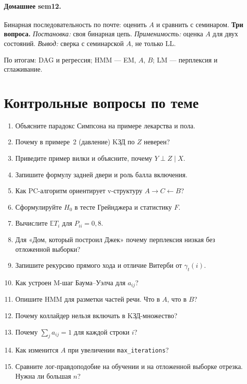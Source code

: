 \paragraph{Домашнее sem12.}
Бинарная последовательность по почте: оценить $A$ и сравнить с семинаром.
\medskip\noindent\textbf{Три вопроса.} \textit{Постановка:} своя бинарная цепь. 
\textit{Применимость:} оценка $A$ для двух состояний. 
\textit{Вывод:} сверка с семинарской $A$, не только LL.\medskip

По итогам: DAG и регрессия; HMM --- EM, $A$, $B$; LM --- перплексия и сглаживание.

\section{Контрольные вопросы по теме}

\begin{enumerate}
    \item Объясните парадокс Симпсона на примере лекарства и пола.
    \item Почему в примере~2 (давление) KЗД по $Z$ неверен?
    \item Приведите пример вилки и объясните, почему $Y\perp Z\mid X$.
    \item Запишите формулу задней двери и роль балла включения.
    \item Как PC-алгоритм ориентирует v-структуру $A\to C\leftarrow B$?
    \item Сформулируйте $H_0$ в тесте Грейнджера и статистику $F$.
    \item Вычислите $\mathbb{E}T_i$ для $P_{ii}=0{,}8$.
    \item Для «Дом, который построил Джек» почему перплексия низкая
          без отложенной выборки?
    \item Запишите рекурсию прямого хода и отличие Витерби от $\gamma_t(i)$.
    \item Как устроен M-шаг Баума--Уэлча для $a_{ij}$?
    \item Опишите HMM для разметки частей речи. Что в $A$, что в $B$?
    \item Почему коллайдер нельзя включать в KЗД-множество?
    \item Почему $\sum_j a_{ij}=1$ для каждой строки $i$?
    \item Как изменится $A$ при увеличении \texttt{max\_iterations}?
    \item Сравните лог-правдоподобие на обучении и на отложенной выборке отрезка. Нужна ли большая $n$?
\end{enumerate}
